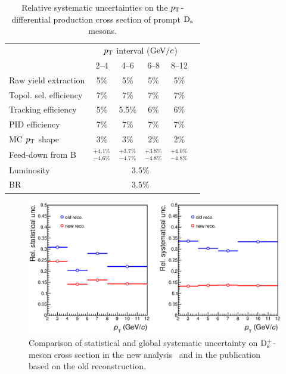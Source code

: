\begin{table}[!h]
\centering
\begin{tabular}{l|ccccc}
 \hline 
 & \multicolumn{4}{c}{$p_{\rm T}$ interval ($\mathrm{GeV}/c$)}\\
 & 2--4 & 4--6 & 6--8 & 8--12\\
\hline
Raw yield extraction & 5\%& 5\%& 5\%& 5\%\\
Topol. sel. efficiency & 7\%& 7\%& 7\%& 7\%\\
Tracking efficiency & 5\%& 5.5\% & 6\% & 6\%\\
PID efficiency & 7\%& 7\%& 7\%& 7\%\\
MC $p_{\rm T}$ shape   &3\%&3\%&2\%&2\%\\
Feed-down from B & $^{+4.1\%}_{-4.6\%}$& $^{+3.7\%}_{-4.7\%}$& $^{+3.8\%}_{-4.8\%}$& $^{+4.0\%}_{-4.8\%}$\\
Luminosity  & \multicolumn{4}{c}{3.5\%} \\
BR  & \multicolumn{4}{c}{3.5\%} \\
\hline 
\end{tabular}
\caption{Relative systematic uncertainties on the $p_{\rm T}$-differential production
cross section of prompt ${\rm D_s}$ mesons.}
\label{tab:SystDs}
\end{table}

\begin{figure}[!h]
\begin{center}
\includegraphics[width=.99\textwidth]{FigCap4/uncertainties_pass2_pass4.eps}
\caption{Comparison of statistical and global systematic uncertainty on ${\rm D_s^+}$-meson
cross section in the new analysis~\cite{Acharya:2017jgo} and in the publication based on the old
reconstruction.}
\label{fig:UncNewVsOld}
\end{center}
\end{figure}


